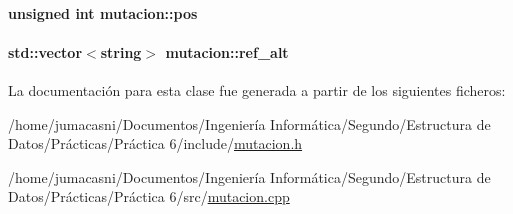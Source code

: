 \paragraph[{\texorpdfstring{pos}{pos}}]{\setlength{\rightskip}{0pt plus 5cm}unsigned int mutacion\+::pos\hspace{0.3cm}{\ttfamily [private]}}\hypertarget{classmutacion_ae1487b8648d0eaad68de5e4e5a87f3ff}{}\label{classmutacion_ae1487b8648d0eaad68de5e4e5a87f3ff}
\paragraph[{\texorpdfstring{ref\+\_\+alt}{ref_alt}}]{\setlength{\rightskip}{0pt plus 5cm}std\+::vector$<$string$>$ mutacion\+::ref\+\_\+alt\hspace{0.3cm}{\ttfamily [private]}}\hypertarget{classmutacion_a2b3d0ed7547618562fae965d373b39e3}{}\label{classmutacion_a2b3d0ed7547618562fae965d373b39e3}


La documentación para esta clase fue generada a partir de los siguientes ficheros\+:\begin{DoxyCompactItemize}
\item 
/home/jumacasni/\+Documentos/\+Ingeniería Informática/\+Segundo/\+Estructura de Datos/\+Prácticas/\+Práctica 6/include/\hyperlink{mutacion_8h}{mutacion.\+h}\item 
/home/jumacasni/\+Documentos/\+Ingeniería Informática/\+Segundo/\+Estructura de Datos/\+Prácticas/\+Práctica 6/src/\hyperlink{mutacion_8cpp}{mutacion.\+cpp}\end{DoxyCompactItemize}
